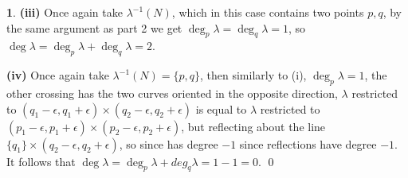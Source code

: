 \documentclass[10.5pt]{article}
\theoremstyle{definition}
\newtheorem{pb}{}
\newcommand{\set}[1]{\{#1\}}
\begin{document}
\begin{pb}
        \textbf{(iii)} Once again take \(\lambda^{-1}(N)\), which in this case contains two points \(p,q\), by the same argument as part 2 we get \(\deg_p \lambda = \deg_q \lambda = 1\), so \(\deg \lambda =  \deg_p \lambda + \deg_q \lambda = 2\).

        \textbf{(iv)} Once again take \(\lambda^{-1}(N) = \set{p,q}\), then similarly to (i), \(\deg_p \lambda = 1\), the other crossing has the two curves oriented in the opposite direction, \(\lambda\) restricted to \((q_1 - \epsilon, q_1 + \epsilon) \times (q_2 - \epsilon, q_2 + \epsilon)\) is equal to \(\lambda\) restricted to \((p_1 - \epsilon, p_1 + \epsilon) \times (p_2 - \epsilon, p_2 + \epsilon)\), but reflecting about the line \(\set{q_1} \times(q_2 - \epsilon, q_2 + \epsilon)\), so since has degree \(-1\) since reflections have degree \(-1\). It follows that \(\deg \lambda = \deg_p \lambda + deg_q \lambda = 1-1 = 0\). \qed
    \end{pb}
\end{document}

